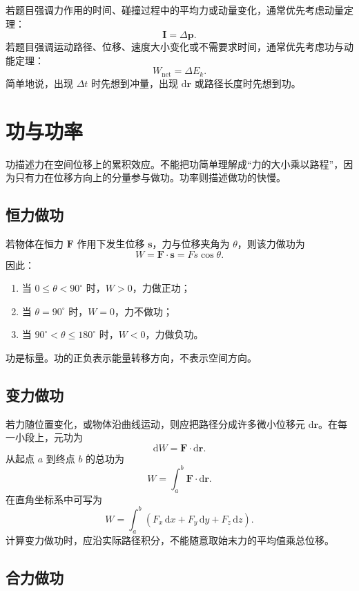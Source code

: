 若题目强调力作用的时间、碰撞过程中的平均力或动量变化，通常优先考虑动量定理：
\[
    \boldsymbol I=\Delta\boldsymbol p.
\]
若题目强调运动路径、位移、速度大小变化或不需要求时间，通常优先考虑功与动能定理：
\[
    W_{\mathrm{net}}=\Delta E_k.
\]
简单地说，出现 $\Delta t$ 时先想到冲量，出现 $\mathrm d\boldsymbol r$ 或路径长度时先想到功。

\newpage

\section{功与功率}

功描述力在空间位移上的累积效应。不能把功简单理解成“力的大小乘以路程”，因为只有力在位移方向上的分量参与做功。功率则描述做功的快慢。

\subsection{恒力做功}

若物体在恒力 $\boldsymbol F$ 作用下发生位移 $\boldsymbol s$，力与位移夹角为 $\theta$，则该力做功为
\[
    W=\boldsymbol F\cdot\boldsymbol s=Fs\cos\theta .
\]
因此：

\begin{enumerate}
    \item 当 $0\leq \theta<90^\circ$ 时，$W>0$，力做正功；
    \item 当 $\theta=90^\circ$ 时，$W=0$，力不做功；
    \item 当 $90^\circ<\theta\leq 180^\circ$ 时，$W<0$，力做负功。
\end{enumerate}

功是标量。功的正负表示能量转移方向，不表示空间方向。

\subsection{变力做功}

若力随位置变化，或物体沿曲线运动，则应把路径分成许多微小位移元 $\mathrm d\boldsymbol r$。在每一小段上，元功为
\[
    \mathrm dW=\boldsymbol F\cdot\mathrm d\boldsymbol r .
\]
从起点 $a$ 到终点 $b$ 的总功为
\[
    \boxed{
    W=\int_a^b\boldsymbol F\cdot\mathrm d\boldsymbol r
    } .
\]
在直角坐标系中可写为
\[
    W=\int_a^b
    \left(
    F_x\,\mathrm dx+F_y\,\mathrm dy+F_z\,\mathrm dz
    \right).
\]
计算变力做功时，应沿实际路径积分，不能随意取始末力的平均值乘总位移。

\subsection{合力做功}

